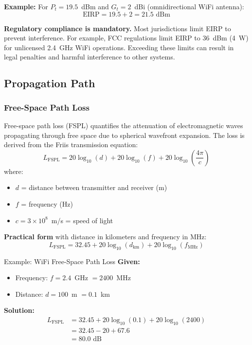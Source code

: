 \textbf{Example:} For $P_t = 19.5$~dBm and $G_t = 2$~dBi (omnidirectional WiFi antenna):
\begin{equation*}
\text{EIRP} = 19.5 + 2 = 21.5\text{~dBm}
\end{equation*}

\begin{warningbox}
\textbf{Regulatory compliance is mandatory.} Most jurisdictions limit EIRP to prevent interference. For example, FCC regulations limit EIRP to 36~dBm (4~W) for unlicensed 2.4~GHz WiFi operations. Exceeding these limits can result in legal penalties and harmful interference to other systems.
\end{warningbox}

\subsection{Propagation Path}

\subsubsection{Free-Space Path Loss}

Free-space path loss (FSPL) quantifies the attenuation of electromagnetic waves propagating through free space due to spherical wavefront expansion. The loss is derived from the Friis transmission equation:
\begin{equation}
L_{\text{FSPL}} = 20\log_{10}(d) + 20\log_{10}(f) + 20\log_{10}\left(\frac{4\pi}{c}\right)
\label{eq:fspl-full}
\end{equation}
where:
\begin{itemize}
\item $d$ = distance between transmitter and receiver (m)
\item $f$ = frequency (Hz)
\item $c = 3 \times 10^8$~m/s = speed of light
\end{itemize}

\textbf{Practical form} with distance in kilometers and frequency in MHz:
\begin{equation}
L_{\text{FSPL}} = 32.45 + 20\log_{10}(d_{\text{km}}) + 20\log_{10}(f_{\text{MHz}})
\label{eq:fspl-practical}
\end{equation}

\begin{calloutbox}{Example: WiFi Free-Space Path Loss}
\textbf{Given:}
\begin{itemize}
\item Frequency: $f = 2.4$~GHz $= 2400$~MHz
\item Distance: $d = 100$~m $= 0.1$~km
\end{itemize}

\textbf{Solution:}
\begin{align*}
L_{\text{FSPL}} &= 32.45 + 20\log_{10}(0.1) + 20\log_{10}(2400) \\
&= 32.45 - 20 + 67.6 \\
&= 80.0\text{~dB}
\end{align*}
\end{calloutbox}

